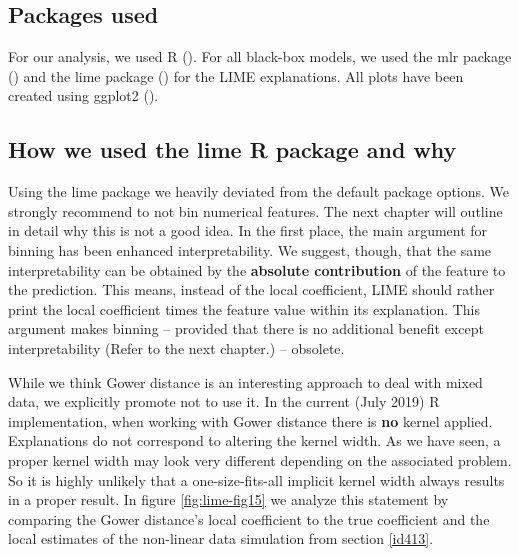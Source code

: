 \documentclass[]{krantz}
\begin{document}
\subsection{Packages used}\label{id61}

For our analysis, we used R (\citet{R-base}). For all black-box models,
we used the mlr package (\citet{R-mlr}) and the lime package
(\citet{R-lime}) for the LIME explanations. All plots have been created
using ggplot2 (\citet{R-ggplot2}).

\subsection{How we used the lime R package and why}\label{id62}

Using the lime package we heavily deviated from the default package
options. We strongly recommend to not bin numerical features. The next
chapter will outline in detail why this is not a good idea. In the first
place, the main argument for binning has been enhanced interpretability.
We suggest, though, that the same interpretability can be obtained by
the \textbf{absolute contribution} of the feature to the prediction.
This means, instead of the local coefficient, LIME should rather print
the local coefficient times the feature value within its explanation.
This argument makes binning -- provided that there is no additional
benefit except interpretability (Refer to the next chapter.) --
obsolete.

While we think Gower distance is an interesting approach to deal with
mixed data, we explicitly promote not to use it. In the current (July
2019) R implementation, when working with Gower distance there is
\textbf{no} kernel applied. Explanations do not correspond to altering
the kernel width. As we have seen, a proper kernel width may look very
different depending on the associated problem. So it is highly unlikely
that a one-size-fits-all implicit kernel width always results in a
proper result. In figure \ref{fig:lime-fig15} we analyze this statement
by comparing the Gower distance's local coefficient to the true
coefficient and the local estimates of the non-linear data simulation
from section \ref{id413}.
\end{document}
